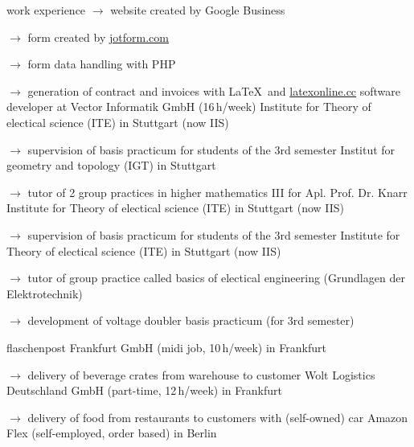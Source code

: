 \begin{rubric}{\textcolor{black!20!blue!100}{work experience}}
			\setlength{\hangindent}{\widthof{$\rightarrow$ }}
			$\rightarrow$ website created by Google Business

			$\rightarrow$ form created by \href{https://www.jotform.com/}{jotform.com}

			$\rightarrow$ form data handling with PHP

			$\rightarrow$ generation of contract and invoices with \LaTeX\ and \href{https://latexonline.cc/}{latexonline.cc}
%			
		\entry*[05/2016 --- 10/2017]
			software developer at Vector Informatik GmbH (16\,h/week)
		\entry*[10/2015 --- 03/2016]
			Institute for Theory of electical science (ITE) in Stuttgart (now IIS)
				
			\setlength{\hangindent}{\widthof{$\rightarrow$ }}
			$\rightarrow$ supervision of basis practicum for students of the 3rd semester
		\entry*
			Institut for geometry and topology (IGT) in Stuttgart
			
			\setlength{\hangindent}{\widthof{$\rightarrow$ }}
			$\rightarrow$ tutor of 2 group practices in higher mathematics III for Apl. Prof. Dr. Knarr
		\entry*[10/2014 --- 03/2015]
			Institute for Theory of electical science (ITE) in Stuttgart (now IIS)
			
			\setlength{\hangindent}{\widthof{$\rightarrow$ }}
			$\rightarrow$ supervision of basis practicum for students of the 3rd semester
		\entry*[10/2013 --- 03/2014]
			Institute for Theory of electical science (ITE) in Stuttgart (now IIS)
			
			\setlength{\hangindent}{\widthof{$\rightarrow$ }}
			$\rightarrow$ tutor of group practice called basics of electical engineering (\glqq Grundlagen der Elektrotechnik\grqq)
			
			$\rightarrow$ development of voltage doubler basis practicum (for 3rd semester)
	
		\entry*[23/03/2024 --- 26/04/2024]
			flaschenpost Frankfurt GmbH (midi job, 10\,h/week) in Frankfurt
			
			\setlength{\hangindent}{\widthof{$\rightarrow$ }}
			$\rightarrow$ delivery of beverage crates from warehouse to customer
		\entry*[06/03/2024 --- 30/04/2024]
			Wolt Logistics Deutschland GmbH (part-time, 12\,h/week) in Frankfurt
			
			\setlength{\hangindent}{\widthof{$\rightarrow$ }}
			$\rightarrow$ delivery of food from restaurants to customers with (self-owned) car
		\entry*[09/11/2020 --- 06/2022]
			Amazon Flex (self-employed, order based) in Berlin
			

\end{rubric}

